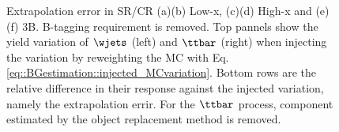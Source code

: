 \begin{figure}[h]
 \caption{Extrapolation error in SR/CR (a)(b) Low-x, (c)(d) High-x and (e)(f) 3B. B-tagging requirement is removed. Top pannels show the yield variation of $\wjets$ (left) and $\ttbar$ (right) when injecting the variation by reweighting the MC with Eq. \ref{eq::BGestimation::injected_MCvariation}. Bottom rows are the relative difference in their response against the injected variation, namely the extrapolation errir. For the $\ttbar$ process, component estimated by the object replacement method is removed.  \label{fig::BGestimation::valid_extp_6J} }
\end{figure}




